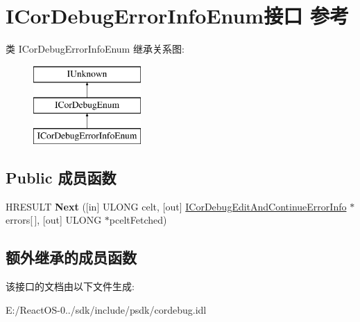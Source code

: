 \hypertarget{interface_i_cor_debug_error_info_enum}{}\section{I\+Cor\+Debug\+Error\+Info\+Enum接口 参考}
\label{interface_i_cor_debug_error_info_enum}
类 I\+Cor\+Debug\+Error\+Info\+Enum 继承关系图\+:\begin{figure}[H]
\begin{center}
\leavevmode
\includegraphics[height=3.000000cm]{interface_i_cor_debug_error_info_enum}
\end{center}
\end{figure}
\subsection*{Public 成员函数}
\begin{DoxyCompactItemize}
\item 
\mbox{\label{interface_i_cor_debug_error_info_enum_a92a0f24f8eb9c5da1e5f8b92c1ba2a3a}} 
H\+R\+E\+S\+U\+LT {\bfseries Next} (\mbox{[}in\mbox{]} U\+L\+O\+NG celt, \mbox{[}out\mbox{]} \hyperlink{interface_i_cor_debug_edit_and_continue_error_info}{I\+Cor\+Debug\+Edit\+And\+Continue\+Error\+Info} $\ast$errors\mbox{[}$\,$\mbox{]}, \mbox{[}out\mbox{]} U\+L\+O\+NG $\ast$pcelt\+Fetched)
\end{DoxyCompactItemize}
\subsection*{额外继承的成员函数}


该接口的文档由以下文件生成\+:\begin{DoxyCompactItemize}
\item 
E\+:/\+React\+O\+S-\/0../sdk/include/psdk/cordebug.\+idl\end{DoxyCompactItemize}
